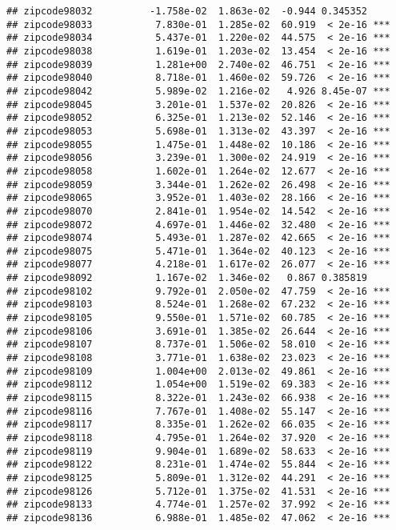 \documentclass[]{article}
\begin{document}
\begin{verbatim}
## zipcode98032          -1.758e-02  1.863e-02  -0.944 0.345352    
## zipcode98033           7.830e-01  1.285e-02  60.919  < 2e-16 ***
## zipcode98034           5.437e-01  1.220e-02  44.575  < 2e-16 ***
## zipcode98038           1.619e-01  1.203e-02  13.454  < 2e-16 ***
## zipcode98039           1.281e+00  2.740e-02  46.751  < 2e-16 ***
## zipcode98040           8.718e-01  1.460e-02  59.726  < 2e-16 ***
## zipcode98042           5.989e-02  1.216e-02   4.926 8.45e-07 ***
## zipcode98045           3.201e-01  1.537e-02  20.826  < 2e-16 ***
## zipcode98052           6.325e-01  1.213e-02  52.146  < 2e-16 ***
## zipcode98053           5.698e-01  1.313e-02  43.397  < 2e-16 ***
## zipcode98055           1.475e-01  1.448e-02  10.186  < 2e-16 ***
## zipcode98056           3.239e-01  1.300e-02  24.919  < 2e-16 ***
## zipcode98058           1.602e-01  1.264e-02  12.677  < 2e-16 ***
## zipcode98059           3.344e-01  1.262e-02  26.498  < 2e-16 ***
## zipcode98065           3.952e-01  1.403e-02  28.166  < 2e-16 ***
## zipcode98070           2.841e-01  1.954e-02  14.542  < 2e-16 ***
## zipcode98072           4.697e-01  1.446e-02  32.480  < 2e-16 ***
## zipcode98074           5.493e-01  1.287e-02  42.665  < 2e-16 ***
## zipcode98075           5.471e-01  1.364e-02  40.123  < 2e-16 ***
## zipcode98077           4.218e-01  1.617e-02  26.077  < 2e-16 ***
## zipcode98092           1.167e-02  1.346e-02   0.867 0.385819    
## zipcode98102           9.792e-01  2.050e-02  47.759  < 2e-16 ***
## zipcode98103           8.524e-01  1.268e-02  67.232  < 2e-16 ***
## zipcode98105           9.550e-01  1.571e-02  60.785  < 2e-16 ***
## zipcode98106           3.691e-01  1.385e-02  26.644  < 2e-16 ***
## zipcode98107           8.737e-01  1.506e-02  58.010  < 2e-16 ***
## zipcode98108           3.771e-01  1.638e-02  23.023  < 2e-16 ***
## zipcode98109           1.004e+00  2.013e-02  49.861  < 2e-16 ***
## zipcode98112           1.054e+00  1.519e-02  69.383  < 2e-16 ***
## zipcode98115           8.322e-01  1.243e-02  66.938  < 2e-16 ***
## zipcode98116           7.767e-01  1.408e-02  55.147  < 2e-16 ***
## zipcode98117           8.335e-01  1.262e-02  66.035  < 2e-16 ***
## zipcode98118           4.795e-01  1.264e-02  37.920  < 2e-16 ***
## zipcode98119           9.904e-01  1.689e-02  58.633  < 2e-16 ***
## zipcode98122           8.231e-01  1.474e-02  55.844  < 2e-16 ***
## zipcode98125           5.809e-01  1.312e-02  44.291  < 2e-16 ***
## zipcode98126           5.712e-01  1.375e-02  41.531  < 2e-16 ***
## zipcode98133           4.774e-01  1.257e-02  37.992  < 2e-16 ***
## zipcode98136           6.988e-01  1.485e-02  47.062  < 2e-16 ***

\end{verbatim}
\end{document}
